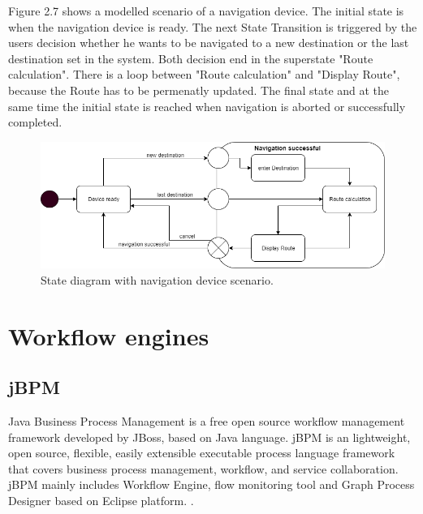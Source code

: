 \newpage
Figure 2.7 shows a modelled scenario of a navigation device. The initial state is when the navigation device is ready. The next State Transition is triggered by the users decision whether he wants to be navigated to a new destination or the last destination set in the system. Both decision end in the superstate "Route calculation". There is a loop between "Route calculation" and "Display Route", because the Route has to be permenatly updated. The final state and at the same time the initial state is reached when navigation is aborted or successfully completed.\\

\begin{figure}[!hb]
	\centering
	\includegraphics[scale=0.55]{UMLState}
	\caption{State diagram with navigation device scenario.}
\end{figure}

\chapter{Workflow engines}

\section{jBPM}
Java Business Process Management is a free open source workflow management framework developed by JBoss, based on Java language. jBPM is an lightweight, open source, flexible, easily extensible executable process language framework that covers business process management, workflow, and service collaboration. jBPM mainly includes Workflow Engine, flow monitoring tool and Graph Process Designer based on Eclipse platform. \cite{.2018}.
 \cite{ParedesVillegas.1993}
 
